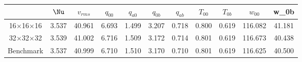 \begin{tabular}{c|cccccccccc}
    & $\Nu$ & $v_{rms}$ & $q_{00}$ & $q_{a0}$ &  $q_{0b}$ &$q_{ab}$ & $T_{00}$ & $T_{0b}$ & $w_{00}$ & w_{0b} \\
\hline
16$\times$16$\times$16 & 3.537 & 40.961 & 6.693 & 1.499 & 3.207 & 0.718 &0.800 & 0.619 &116.082 & 41.181 \\
32$\times$32$\times$32 & 3.539 & 41.002 & 6.716 & 1.509 & 3.172 & 0.714 &0.801 & 0.619 &116.673 & 40.438 \\
\hline
Benchmark & 3.537 & 40.999 & 6.710 & 1.510 & 3.170 & 0.710 &0.801 & 0.619 &116.625 & 40.500 \\
\end{tabular}
